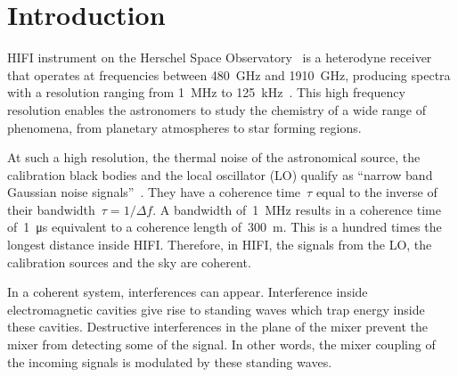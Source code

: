 \documentclass[journal]{IEEEtran}
\begin{document}
%
\IEEEpeerreviewmaketitle



\section{Introduction}
% 
% 
% 
% 
 HIFI instrument on the Herschel Space Observatory~\cite{AA_518_L1} is a heterodyne receiver that operates at frequencies between \SI{480}{\giga\hertz} and \SI{1910}{\giga\hertz},
producing spectra with a resolution ranging from \SI{1}{\mega\hertz} to \SI{125}{\kilo\hertz}~\cite{AA_518_L6}.
This high frequency resolution enables the astronomers to study the chemistry of a wide range of phenomena, from planetary atmospheres to star forming regions.

At such a high resolution, the thermal noise of the astronomical source, the calibration black bodies and the local oscillator (LO) qualify as ``narrow band Gaussian noise signals''~\cite{siegman1986lasers}.
They have a coherence time~$\tau$ equal to the inverse of their bandwidth~$\tau=1/\Delta f$.
A bandwidth of~\SI{1}{\mega\hertz} results in a coherence time of~\SI{1}{\micro\second} equivalent to a coherence length of~\SI{300}{\meter}.
This is a hundred times the longest distance inside HIFI.
Therefore, in HIFI, the signals from the LO, the calibration sources and the sky are coherent.

In a coherent system, interferences can appear.
Interference inside electromagnetic cavities give rise to standing waves which trap energy inside these cavities.
Destructive interferences in the plane of the mixer prevent the mixer from detecting some of the signal.
In other words, the mixer coupling of the incoming signals is modulated by these standing waves.
\end{document}
